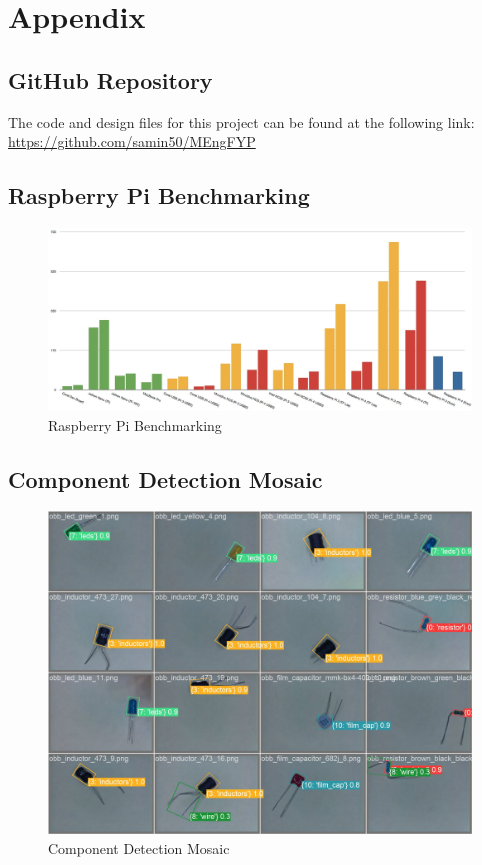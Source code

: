 \newpage
\section{Appendix}
\label{sec:appendix}
\subsection{GitHub Repository}
\label{app:github}
The code and design files for this project can be found at the following link: \\
\url{https://github.com/samin50/MEngFYP}


\subsection{Raspberry Pi Benchmarking}
\begin{figure}[H]
  \centering
  \includegraphics[width=\textwidth]{imgs/articles/benchmarks.png}
  \caption{Raspberry Pi Benchmarking}
  \label{app:benchmarking}
\end{figure}

\subsection{Component Detection Mosaic}
\begin{figure}[H]
  \centering
  \includegraphics[width=\textwidth]{imgs/cv/val_batch1_pred.jpg}
  \caption{Component Detection Mosaic}
  \label{app:mosaic}
\end{figure}